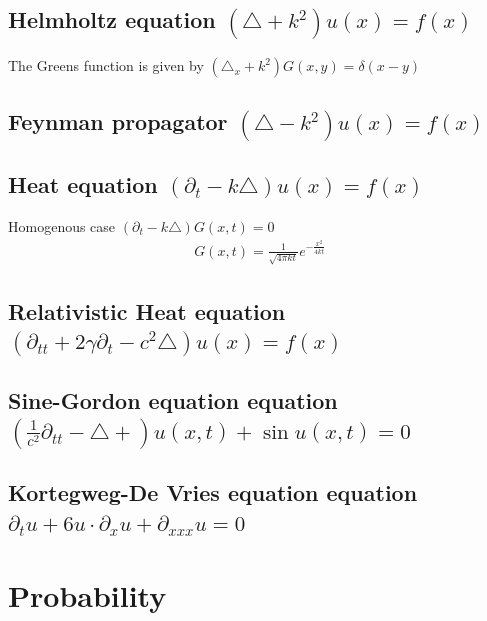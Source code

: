 \documentclass[10pt,a4paper]{book}
\theoremstyle{definition}
\begin{document}
\newpage
\subsection{Helmholtz equation \texorpdfstring{$(\triangle +k^2)u(x)= f(x)$}{TEXT}}
The Greens function is given by $(\triangle_x +k^2)G(x,y)=\delta(x-y)$

\subsection{Feynman propagator \texorpdfstring{$\left(\triangle-k^2\right) u(x)= f(x)$}{TEXT}}

\subsection{Heat equation \texorpdfstring{$\left(\partial_{t}-k\triangle\right) u(x)= f(x)$}{TEXT}}

Homogenous case $\left(\partial_{t}-k\triangle\right) G(x,t)=0$
\begin{align}
G(x,t)=\frac{1}{\sqrt{4\pi kt}}e^{-\frac{x^2}{4kt}}
\end{align}



\subsection{Relativistic Heat equation \texorpdfstring{$\left(\partial_{tt}+2\gamma\partial_t-c^2\triangle\right) u(x)= f(x)$}{TEXT}}

\subsection{Sine-Gordon equation equation \texorpdfstring{$\left(\frac{1}{c^2}\partial_{tt}-\triangle+\right) u(x,t)+\sin u(x,t)=0$}{TEXT}}

\subsection{Kortegweg-De Vries equation equation \texorpdfstring{$\partial_tu+6u\cdot\partial_x u+\partial_{xxx}u= 0$}{TEXT}}

\newpage
\section{Probability}
\end{document}
